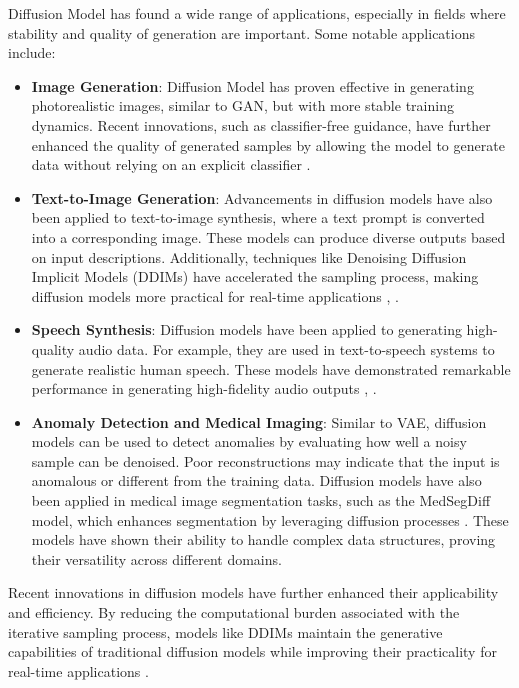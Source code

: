 Diffusion Model has found a wide range of applications, especially in fields where stability and quality of generation are important. Some notable applications include:
\begin{itemize}
    \item \textbf{Image Generation}: Diffusion Model has proven effective in generating photorealistic images, similar to GAN, but with more stable training dynamics. Recent innovations, such as classifier-free guidance, have further enhanced the quality of generated samples by allowing the model to generate data without relying on an explicit classifier \citep{10.48550/arxiv.2207.12598}.
    \item \textbf{Text-to-Image Generation}: Advancements in diffusion models have also been applied to text-to-image synthesis, where a text prompt is converted into a corresponding image. These models can produce diverse outputs based on input descriptions. Additionally, techniques like Denoising Diffusion Implicit Models (DDIMs) have accelerated the sampling process, making diffusion models more practical for real-time applications \citep{10.48550/arxiv.2010.02502}, \citep{10.48550/arxiv.2111.15640}.
    \item \textbf{Speech Synthesis}: Diffusion models have been applied to generating high-quality audio data. For example, they are used in text-to-speech systems to generate realistic human speech. These models have demonstrated remarkable performance in generating high-fidelity audio outputs \citep{10.48550/arxiv.2201.11972}, \citep{10.48550/arxiv.2009.09761}.
    \item \textbf{Anomaly Detection and Medical Imaging}: Similar to VAE, diffusion models can be used to detect anomalies by evaluating how well a noisy sample can be denoised. Poor reconstructions may indicate that the input is anomalous or different from the training data. Diffusion models have also been applied in medical image segmentation tasks, such as the MedSegDiff model, which enhances segmentation by leveraging diffusion processes \citep{10.48550/arxiv.2211.00611}. These models have shown their ability to handle complex data structures, proving their versatility across different domains.
\end{itemize}

Recent innovations in diffusion models have further enhanced their applicability and efficiency. By reducing the computational burden associated with the iterative sampling process, models like DDIMs maintain the generative capabilities of traditional diffusion models while improving their practicality for real-time applications \citep{10.48550/arxiv.2101.02388}.

